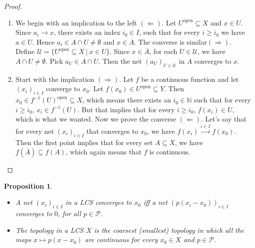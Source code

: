\documentclass[10pt, a4paper]{article}
\newtheorem{proposition}[thm]{Proposition}
\newenvironment{noticeC}{%
  \tcolorbox[%
  notitle,
  empty,
  enhanced,  %
  breakable,
  coltext=black, 
  fontupper=\rmfamily,
  noparskip,
  sharp corners,
  boxrule=-1pt,  %
  frame hidden,
  left=7pt,  %
  right=7pt,
  top=5pt,
  bottom=5pt,
  before skip=2.5ex plus 2pt,
  after skip=2.5ex plus 2pt,
  overlay unbroken and last={%
  },
  ]}
{\endtcolorbox}
\newenvironment{myproof}%
  {\begin{noticeC}\begin{proof}}%
  {\end{proof}\end{noticeC}}
\newcommand{\N}{\mathbb {N}}
\begin{document}
\begin{myproof}
  \begin{enumerate}
    \item We begin with an implication to the left $(\Leftarrow)$.
    Let $U^{\textrm{open}} \subseteq X$ and $x \in U$. Since $a_i \to x$, there exists an index $i_0 \in I$,
    such that for every $i \geq i_0$ we have $a \in U$. Hence $a_i \in A \cap U \neq \emptyset$ and $x \in \overline{A}$.
    The converse is similar$(\Rightarrow)$. Define $\mathcal{U} = \{U^{\textrm{open}} \subseteq X\ |\ x \in U\}$.
    Since $x \in \overline{A}$, for each $U \in \mathcal{U}$, we have $A \cap U \neq \emptyset$.
    Pick $a_U \in A \cap U$. Then the net $(a_U)_{U \in \mathcal{U}}$ in $A$ converges to $x$.
    \item Start with the implication $(\Rightarrow)$. Let $f$ be a continuous function and let $(x_i)_{i \in I}$ converge to $x_0$.
    Let $f(x_0) \in U^{\textrm{open}} \subseteq Y$. Then $x_0 \in f^{-1} (U) ^{\textrm{open}} \subseteq X$, which means there exists an $i_0 \in \N$ 
    such that for every $i \geq i_0$, $x_i \in f^{-1} (U)$. But that implies that for every $i \geq i_0$, $f(x_i) \in U$, which is what we wanted.
    Now we prove the converse $(\Leftarrow)$. Let's say that for every net $(x_i)_{i \in I}$ that converges to $x_0$, we have $f(x_i) \xrightarrow{i \in I} f(x_0)$.
    Then the first point implies that for every set $A \subseteq X$, we have $f(\overline{A}) \subseteq \overline{f(A)}$,
    which again means that $f$ is continuous. \qedhere
  \end{enumerate}
\end{myproof}

\begin{proposition}
    \begin{itemize}
        \item[(a)] A net $(x_i)_{i \in I}$ in a LCS converges to $x_0$ iff a net $(p(x_i - x_0))_{i \in I}$ converges to $0$, for all $p \in \mathcal{P}$.
        \item[(b)] The topology in a LCS $X$ is the coarsest (smallest) topology in which all the maps 
        $x \mapsto p(x - x_0)$ are continuous for every $x_0 \in X$ and $p \in \mathcal{P}$.
    \end{itemize}
\end{proposition}
\end{document}
